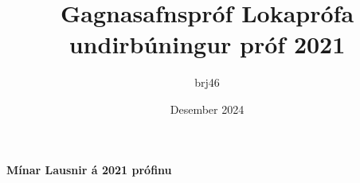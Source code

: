 \documentclass{article}
\title{Gagnasafnspróf Lokaprófa undirbúningur próf 2021}
\author{brj46 }
\date{Desember 2024}
\begin{document}
\maketitle

\begin{center}
\LARGE{\textbf{Mínar Lausnir á 2021 prófinu}}
\end{center}
\end{document}
